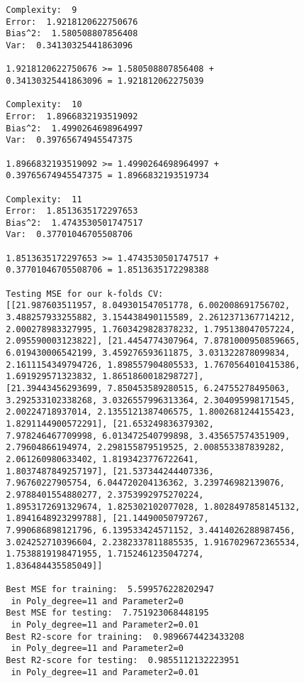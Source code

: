 \begin{verbatim}
        Complexity:  9
        Error:  1.9218120622750676
        Bias^2:  1.580508807856408
        Var:  0.34130325441863096
        
        1.9218120622750676 >= 1.580508807856408 +
        0.34130325441863096 = 1.921812062275039
        
        Complexity:  10
        Error:  1.8966832193519092
        Bias^2:  1.4990264698964997
        Var:  0.39765674945547375
        
        1.8966832193519092 >= 1.4990264698964997 +
        0.39765674945547375 = 1.8966832193519734
        
        Complexity:  11
        Error:  1.8513635172297653
        Bias^2:  1.4743530501747517
        Var:  0.37701046705508706
        
        1.8513635172297653 >= 1.4743530501747517 +
        0.37701046705508706 = 1.8513635172298388
        
        Testing MSE for our k-folds CV:  
        [[21.987603511957, 8.049301547051778, 6.002008691756702,
        3.488257933255882, 3.154438490115589, 2.2612371367714212,
        2.000278983327995, 1.7603429828378232, 1.795138047057224,
        2.095590003123822], [21.4454774307964, 7.8781000950859665,
        6.019430006542199, 3.459276593611875, 3.031322878099834,
        2.1611154349794726, 1.898557904805533, 1.7670564010415386,
        1.691929571323832, 1.8651860018298727],
        [21.39443456293699, 7.850453589280515, 6.24755278495063,
        3.292533102338268, 3.0326557996313364, 2.304095998171545,
        2.00224718937014, 2.1355121387406575, 1.8002681244155423,
        1.8291144900572291], [21.653249836379302,
        7.978246467709998, 6.013472540799898, 3.435657574351909,
        2.79604866194974, 2.298155879519525, 2.008553387839282,
        2.061260980633402, 1.8193423776722641,
        1.8037487849257197], [21.537344244407336,
        7.96760227905754, 6.044720204136362, 3.239746982139076,
        2.9788401554880277, 2.3753992975270224,
        1.8953172691329674, 1.825302102077028, 1.8028497858145132,
        1.8941648923299788], [21.14490050797267,
        7.990686898121796, 6.139533424571152, 3.4414026288987456,
        3.024252710396604, 2.2382337811885535, 1.9167029672365534,
        1.7538819198471955, 1.7152461235047274,
        1.836484435585049]]
        
        Best MSE for training:  5.599576228202947 
         in Poly_degree=11 and Parameter2=0
        Best MSE for testing:  7.751923068448195 
         in Poly_degree=11 and Parameter2=0.01
        Best R2-score for training:  0.9896674423433208 
         in Poly_degree=11 and Parameter2=0
        Best R2-score for testing:  0.9855112132223951 
         in Poly_degree=11 and Parameter2=0.01
         

\end{verbatim}
